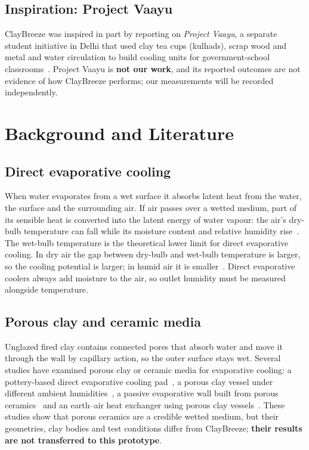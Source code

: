 \documentclass[11pt,a4paper]{report}
\begin{document}
\section{Inspiration: Project Vaayu}
ClayBreeze was inspired in part by reporting on \emph{Project Vaayu}, a separate student initiative in Delhi that used clay tea cups (kulhads), scrap wood and metal and water circulation to build cooling units for government-school classrooms~\cite{toi,afn}. Project Vaayu is \textbf{not our work}, and its reported outcomes are not evidence of how ClayBreeze performs; our measurements will be recorded independently.

\chapter{Background and Literature}

\section{Direct evaporative cooling}
When water evaporates from a wet surface it absorbs latent heat from the water, the surface and the surrounding air. If air passes over a wetted medium, part of its sensible heat is converted into the latent energy of water vapour: the air's dry-bulb temperature can fall while its moisture content and relative humidity rise~\cite{watson}. The wet-bulb temperature is the theoretical lower limit for direct evaporative cooling. In dry air the gap between dry-bulb and wet-bulb temperature is larger, so the cooling potential is larger; in humid air it is smaller~\cite{watson}. Direct evaporative coolers always add moisture to the air, so outlet humidity must be measured alongside temperature.

\section{Porous clay and ceramic media}
Unglazed fired clay contains connected pores that absorb water and move it through the wall by capillary action, so the outer surface stays wet. Several studies have examined porous clay or ceramic media for evaporative cooling: a pottery-based direct evaporative cooling pad~\cite{laknizi}, a porous clay vessel under different ambient humidities~\cite{mittal}, a passive evaporative wall built from porous ceramics~\cite{hoyano} and an earth--air heat exchanger using porous clay vessels~\cite{elsaid}. These studies show that porous ceramics are a credible wetted medium, but their geometries, clay bodies and test conditions differ from ClayBreeze; \textbf{their results are not transferred to this prototype}.
\end{document}
